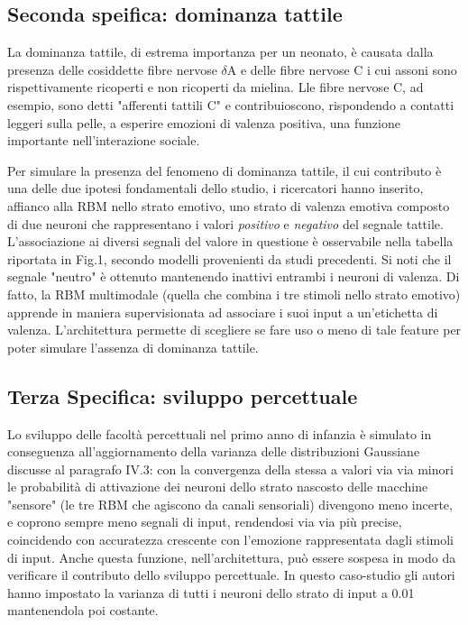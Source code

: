 \documentclass[10pt,letterpaper]{article}
\begin{document}
\subsection{Seconda speifica: dominanza tattile}
La dominanza tattile, di estrema importanza per un neonato, è causata dalla presenza delle cosiddette fibre nervose $\delta$A e delle fibre nervose C i cui assoni sono rispettivamente ricoperti e non ricoperti da mielina. Lle fibre nervose C, ad esempio, sono detti "afferenti tattili C" e contribuioscono, rispondendo a contatti leggeri sulla pelle, a esperire emozioni di valenza positiva, una funzione importante nell'interazione sociale.

Per simulare la presenza del fenomeno di dominanza tattile, il cui contributo è una delle due ipotesi fondamentali dello studio, i ricercatori hanno inserito, affianco alla RBM nello strato emotivo, uno strato di valenza emotiva composto di due neuroni che rappresentano i valori \textit{positivo} e \textit{negativo} del segnale tattile. L'associazione ai diversi segnali del valore in questione è osservabile nella tabella riportata in Fig.1, secondo modelli provenienti da studi precedenti. Si noti che il segnale "neutro" è ottenuto mantenendo inattivi entrambi i neuroni di valenza. Di fatto, la RBM multimodale (quella che combina i tre stimoli nello strato emotivo) apprende in maniera supervisionata ad associare i suoi input a un'etichetta di valenza. L'architettura permette di scegliere se fare uso o meno di tale feature per poter simulare l'assenza di dominanza tattile.

\subsection{Terza Specifica: sviluppo percettuale}
Lo sviluppo delle facoltà percettuali nel primo anno di infanzia è simulato in conseguenza all'aggiornamento della varianza delle distribuzioni Gaussiane discusse al paragrafo IV.3: con la convergenza della stessa a valori via via minori le probabilità di attivazione dei neuroni dello strato nascosto delle macchine "sensore" (le tre RBM che agiscono da canali sensoriali) divengono meno incerte, e coprono sempre meno segnali di input, rendendosi via via più precise, coincidendo con accuratezza crescente con l'emozione rappresentata dagli stimoli di input. Anche questa funzione, nell'architettura, può essere sospesa in modo da verificare il contributo dello sviluppo percettuale. In questo caso-studio gli autori hanno impostato la varianza di tutti i neuroni dello strato di input a 0.01 mantenendola poi costante.
\end{document}
